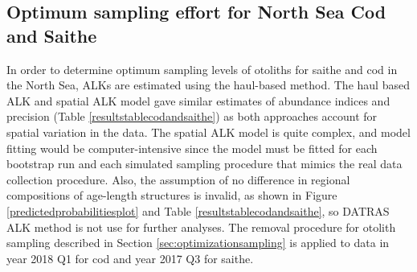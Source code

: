 \documentclass[a4paper 12pt]{article}
\numberwithin{equation}{section}
\begin{document}
%
%


\subsection{Optimum sampling effort for North Sea Cod and Saithe}
\label{sec:optimumeffortresults}
In order to determine optimum sampling levels of otoliths for saithe and cod in the North Sea, ALKs are estimated using the haul-based  method.  The haul based ALK and spatial ALK model gave similar estimates of abundance indices and precision (Table \ref{resultstablecodandsaithe}) as both approaches account for spatial variation in the data. The spatial ALK model is  quite complex, and model fitting would be computer-intensive since the model must be fitted for each bootstrap run and each simulated sampling procedure that mimics the real data collection procedure. Also, the assumption of no difference in regional compositions of age-length structures is invalid,  as shown in Figure \ref{predictedprobabilitiesplot} and Table \ref{resultstablecodandsaithe},  so DATRAS ALK method is not use for further analyses. The removal procedure for otolith sampling described in Section \ref{sec:optimizationsampling} is applied to data in year 2018 Q1 for cod and year 2017 Q3 for saithe.
\end{document}
